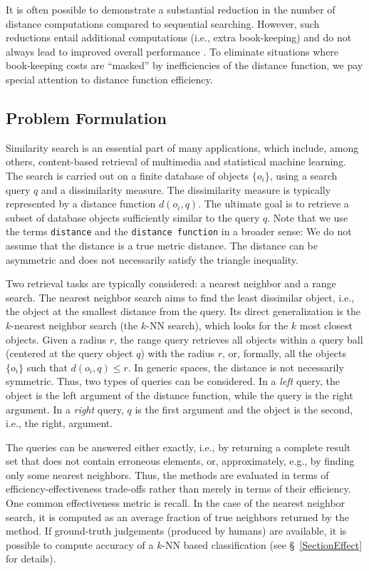\documentclass[runningheads,a4paper]{llncs}
\newcommand{\ttt}[1]{\texttt{#1}}
\newcommand{\knn}{$k$-NN }
\begin{document}
{It is often possible to demonstrate a substantial reduction in the number of distance computations
compared to sequential searching.
However, such reductions entail additional computations (i.e., extra book-keeping)
and do not always lead to improved overall performance \cite{Boytsov_and_Bilegsaikhan:sisap2013}.
To eliminate situations where book-keeping costs are ``masked''
by inefficiencies of the distance function,
we pay special attention to distance function efficiency.

\subsection{Problem Formulation}
Similarity search is an essential part of many applications,
which include, among others,  
content-based retrieval of multimedia  and statistical machine learning.
The search is carried out on a finite database of objects $\{o_i\}$,
using a search query $q$ and a dissimilarity measure.
The dissimilarity measure is typically represented by a distance function $d(o_i, q)$. 
The ultimate goal is to retrieve a subset of database objects sufficiently similar to the query $q$.
Note that we use the terms \ttt{distance} and the \ttt{distance function} in a broader sense:
We do not assume that the distance is a true metric distance. 
The distance can be asymmetric and does not necessarily satisfy the triangle inequality.

Two retrieval tasks are typically considered: a nearest neighbor and a range search. 
The nearest neighbor search aims to find the least dissimilar object,
i.e., the object at the smallest distance from the query.
Its direct generalization is the $k$-nearest neighbor search (the \knn search),
which looks for the $k$ most closest objects.
Given a radius $r$, 
the range query retrieves all objects within a query ball (centered at the query object $q$) with the radius $r$,
or, formally, all the objects~$\lbrace o_i \rbrace$ such that $d(o_i, q) \le r$. 
In generic spaces, the distance is not necessarily symmetric. 
Thus, two types of queries can be considered. 
In a  \emph{left} query, the object is the left argument of the distance function,
while the query is the right argument.
In a \emph{right} query, $q$ is the first argument and the object is the second, i.e.,
the right, argument.

The queries can be answered either exactly, 
i.e., by returning a complete result set that does not contain erroneous elements, or, 
approximately, e.g., by finding only some nearest neighbors.
Thus, the methods are evaluated in terms of efficiency-effectiveness trade-offs
rather than merely in terms of their efficiency.
One common effectiveness metric is recall. In the case
of the nearest neighbor search, it is computed as
an average fraction of true neighbors returned by the method.
If ground-truth judgements (produced by humans) are available,
it is possible to compute accuracy
of a \knn based classification
(see \S~\ref{SectionEffect} for details).

}
\end{document}
